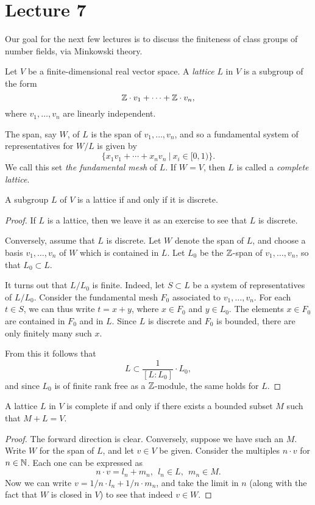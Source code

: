 \section{Lecture 7}

Our goal for the next few lectures is to discuss the finiteness of class groups of number fields, via Minkowski theory.

\begin{definition}
  Let $V$ be a finite-dimensional real vector space.
  A \emph{lattice} $L$ in $V$ is a subgroup of the form
  \[ \mathbb{Z} \cdot v_{1} + \cdots + \mathbb{Z} \cdot v_{n}, \]
  where $v_{1},\ldots,v_{n}$ are linearly independent.
\end{definition}

The span, say $W$, of $L$ is the span of $v_{1},\ldots,v_{n}$, and so a fundamental system of representatives for $W/L$ is given by
\[ \{ x_{1}v_{1} + \cdots + x_{n} v_{n} \ | \ x_{i} \in [0,1)\}. \]
We call this set \emph{the fundamental mesh} of $L$.
If $W = V$, then $L$ is called a \emph{complete lattice}.

\begin{proposition}
  A subgroup $L$ of $V$ is a lattice if and only if it is discrete.
\end{proposition}
\begin{proof}
  If $L$ is a lattice, then we leave it as an exercise to see that $L$ is discrete.

  Conversely, assume that $L$ is discrete.
  Let $W$ denote the span of $L$, and choose a basis $v_{1},\ldots,v_{n}$ of $W$ which is contained in $L$.
  Let $L_{0}$ be the $\mathbb{Z}$-span of $v_{1},\ldots,v_{n}$, so that $L_{0} \subset L$.

  It turns out that $L/L_{0}$ is finite.
  Indeed, let $S \subset L$ be a system of representatives of $L/L_{0}$.
  Consider the fundamental mesh $F_{0}$ associated to $v_{1},\ldots,v_{n}$.
  For each $t \in S$, we can thus write $t = x + y$, where $x \in F_{0}$ and $y \in L_{0}$.
  The elements $x \in F_{0}$ are contained in $F_{0}$ and in $L$.
  Since $L$ is discrete and $F_{0}$ is bounded, there are only finitely many such $x$.

  From this it follows that
  \[ L \subset \frac{1}{[L:L_{0}]} \cdot L_{0}, \]
  and since $L_{0}$ is of finite rank free as a $\mathbb{Z}$-module, the same holds for $L$.
\end{proof}

\begin{lemma}
  A lattice $L$ in $V$ is complete if and only if there exists a bounded subset $M$ such that $M + L = V$.
\end{lemma}
\begin{proof}
  The forward direction is clear.
  Conversely, suppose we have such an $M$.
  Write $W$ for the span of $L$, and let $v \in V$ be given.
  Consider the multiples $n \cdot v$ for $n \in \mathbb{N}$.
  Each one can be expressed as
  \[ n \cdot v = l_{n} + m_{n}, \ \ l_{n} \in L, \ \ m_{n} \in M. \]
  Now we can write $v = 1/n \cdot l_{n} + 1/n \cdot m_{n}$, and take the limit in $n$ (along with the fact that $W$ is closed in $V$) to see that indeed $v \in W$.
\end{proof}

